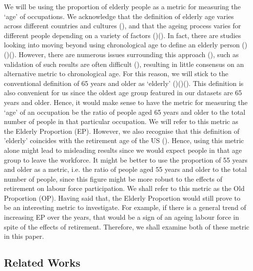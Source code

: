 \documentclass[11pt]{article}
\begin{document}
We will be using the proportion of elderly people as a metric for measuring the `age' of occupations. We acknowledge that the definition of elderly age varies across different countries and cultures (\cite{ageingculture}), and that the ageing process varies for different people depending on a variety of factors (\cite{levine2013modeling})(\cite{hayflick2007biological}). In fact, there are studies looking into moving beyond using chronological age to define an elderly person (\cite{KotterGrhn2015})(\cite{SOTOPEREZDECELIS2018e305})(\cite{klemera2006new}). However, there are numerous issues surrounding this approach (\cite{jylhava2017biological}), such as validation of such results are often difficult (\cite{biologicalagedifficult}), resulting in little consensus on an alternative metric to chronological age. For this reason, we will stick to the conventional definition of 65 years and older as `elderly' (\cite{who2010definition})(\cite{orimo2006reviewing})(\cite{oecddata}). This definition is also convenient for us since the oldest age group featured in our datasets are 65 years and older. Hence, it would make sense to have the metric for measuring the `age' of an occupation be the ratio of people aged 65 years and older to the total number of people in that particular occupation. We will refer to this metric as the Elderly Proportion (EP). However, we also recognise that this definition of 'elderly' coincides with the retirement age of the US (\cite{MunnellAliciaH2013SSRR}). Hence, using this metric alone might lead to misleading results since we would expect people in that age group to leave the workforce. It might be better to use the proportion of 55 years and older as a metric, i.e. the ratio of people aged 55 years and older to the total number of people, since this figure might be more robust to the effects of retirement on labour force participation. We shall refer to this metric as the Old Proportion (OP). Having said that, the Elderly Proportion would still prove to be an interesting metric to investigate. For example, if there is a general trend of increasing EP over the years, that would be a sign of an ageing labour force in spite of the effects of retirement. Therefore, we shall examine both of these metric in this paper.

\subsection*{Related Works}

\newpage
\end{document}
